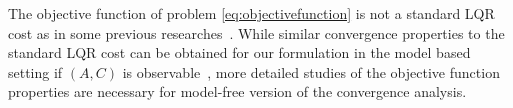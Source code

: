 \begin{remark} \label{remark1}
The objective function of
 problem \eqref{eq:objectivefunction}
is not a
standard LQR cost
as in some previous researches~\cite{modares2016optimal, rizvi2018output}. While similar convergence properties to the standard LQR cost can be obtained for our formulation in the model based setting if $(A, C)$ is observable~\cite{fatkhullin2021optimizing}, more detailed studies of the objective function properties are necessary for model-free version of the convergence analysis.  
\end{remark}





% 